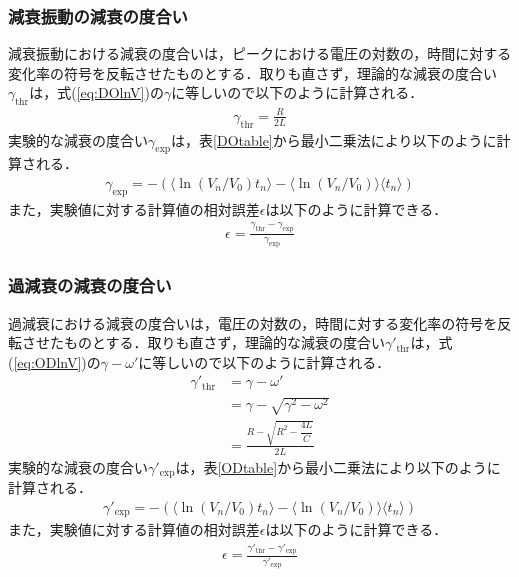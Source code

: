 \documentclass[uplatex,dvipdfmx,a4paper,10pt]{jsarticle}
\begin{document}
\subsubsection{減衰振動の減衰の度合い}
減衰振動における減衰の度合いは，ピークにおける電圧の対数の，時間に対する変化率の符号を反転させたものとする．取りも直さず，理論的な減衰の度合い$\gamma_\mathrm{thr}$は，式(\ref{eq:DOlnV})の$\gamma$に等しいので以下のように計算される．
\begin{align}
    \gamma_\mathrm{thr} = \frac{R}{2L}
\end{align}
実験的な減衰の度合い$\gamma_\mathrm{exp}$は，表\ref{DOtable}から最小二乗法により以下のように計算される．
\begin{align}
    \gamma_\mathrm{exp} = - \left( \langle \ln\left( V_n/V_0 \right) t_n \rangle - \langle \ln\left( V_n/V_0 \right) \rangle \langle t_n \rangle \right)
\end{align}
また，実験値に対する計算値の相対誤差$\epsilon$は以下のように計算できる．
\begin{align}
    \epsilon = \frac{\gamma_\mathrm{thr} - \gamma_\mathrm{exp}}{\gamma_\mathrm{exp}}
\end{align}

\subsubsection{過減衰の減衰の度合い}
過減衰における減衰の度合いは，電圧の対数の，時間に対する変化率の符号を反転させたものとする．取りも直さず，理論的な減衰の度合い$\gamma'_\mathrm{thr}$は，式(\ref{eq:ODlnV})の$\gamma - \omega'$に等しいので以下のように計算される．
\begin{align}
    \gamma'_\mathrm{thr} &= \gamma - \omega'\\
    &= \gamma - \sqrt{\gamma^2 - \omega^2}\\
    &= \frac{R - \sqrt{R^2 -\dfrac{4L}{C}}}{2L}
\end{align}
実験的な減衰の度合い$\gamma'_\mathrm{exp}$は，表\ref{ODtable}から最小二乗法により以下のように計算される．
\begin{align}
    \gamma'_\mathrm{exp} = - \left( \langle \ln\left( V_n/V_0 \right) t_n \rangle - \langle \ln\left( V_n/V_0 \right) \rangle \langle t_n \rangle \right)
\end{align}
また，実験値に対する計算値の相対誤差$\epsilon$は以下のように計算できる．
\begin{align}
    \epsilon = \frac{\gamma'_\mathrm{thr} - \gamma'_\mathrm{exp}}{\gamma'_\mathrm{exp}}
\end{align}
\end{document}
